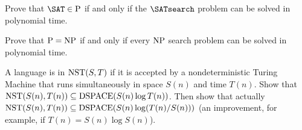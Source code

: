 \documentclass[ps, letterpaper]{cs121}
\begin{document}
\subproblem Prove that $\SAT\in\P$ if and only if the $\SATsearch$ problem can be solved in polynomial time.

\subproblem Prove that $\mathrm{P}=\mathrm{NP}$ if and only if every $\mathrm{NP}$ search problem can be solved in polynomial time.

A language is in  $\mathrm{NST}(S,T)$ if it is accepted by a nondeterministic Turing Machine that runs simultaneously in space $S(n)$ and time $T(n)$. Show that $\mathrm{NST}(S(n),T(n)) \subseteq \mathrm{DSPACE}(S(n) \log T(n))$. Then show that actually $\mathrm{NST}(S(n),T(n)) \subseteq \mathrm{DSPACE}(S(n) \log (T(n)/S(n)))$ (an improvement, for example, if $T(n) = S(n)\log S(n)$).
\end{document}
